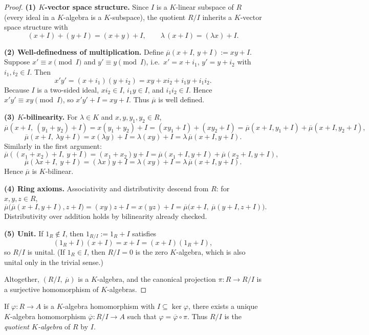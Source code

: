 \begin{proof}
\textbf{(1) $K$-vector space structure.}
Since $I$ is a $K$-linear subspace of $R$ (every ideal in a $K$-algebra is a $K$-subspace),
the quotient $R/I$ inherits a $K$-vector space structure with
\[
(x+I)+(y+I)=(x+y)+I,\qquad
\lambda\,(x+I)=(\lambda x)+I.
\]

\smallskip
\textbf{(2) Well-definedness of multiplication.}
Define $\overline{\mu}(x+I,\,y+I):=xy+I$.
Suppose $x'\equiv x\pmod I$ and $y'\equiv y\pmod I$, i.e.\ $x'=x+i_1$, $y'=y+i_2$ with $i_1,i_2\in I$.
Then
\[
x'y'=(x+i_1)(y+i_2)=xy + x i_2 + i_1 y + i_1 i_2.
\]
Because $I$ is a two-sided ideal, $x i_2\in I$, $i_1 y\in I$, and $i_1 i_2\in I$.
Hence $x'y'\equiv xy\pmod I$, so $x'y'+I=xy+I$.
Thus $\overline{\mu}$ is well defined.

\smallskip
\textbf{(3) $K$-bilinearity.}
For $\lambda\in K$ and $x,y,y_1,y_2\in R$,
\[
\overline{\mu}(x+I,\ (y_1+y_2)+I)
= x(y_1+y_2)+I
= (xy_1+I)+(xy_2+I)
= \overline{\mu}(x+I,y_1+I)+\overline{\mu}(x+I,y_2+I),
\]
\[
\overline{\mu}(x+I,\ \lambda y+I)
= x(\lambda y)+I
= \lambda(xy)+I
= \lambda\,\overline{\mu}(x+I,y+I).
\]
Similarly in the first argument:
\[
\overline{\mu}((x_1+x_2)+I,\ y+I)
= (x_1+x_2)y+I
= \overline{\mu}(x_1+I,y+I)+\overline{\mu}(x_2+I,y+I),
\]
\[
\overline{\mu}(\lambda x+I,\ y+I)
= (\lambda x)y+I
= \lambda(xy)+I
= \lambda\,\overline{\mu}(x+I,y+I).
\]
Hence $\overline{\mu}$ is $K$-bilinear.

\smallskip
\textbf{(4) Ring axioms.}
Associativity and distributivity descend from $R$:
for $x,y,z\in R$,
\[
\overline{\mu}\bigl(\overline{\mu}(x+I,y+I),z+I\bigr)
=(xy)z+I
= x(yz)+I
= \overline{\mu}\bigl(x+I,\ \overline{\mu}(y+I,z+I)\bigr).
\]
Distributivity over addition holds by bilinearity already checked.

\smallskip
\textbf{(5) Unit.}
If $1_R\notin I$, then $1_{R/I}:=1_R+I$ satisfies
\[
(1_R+I)(x+I)=x+I=(x+I)(1_R+I),
\]
so $R/I$ is unital. (If $1_R\in I$, then $R/I=0$ is the zero $K$-algebra, which is also unital only in the trivial sense.)

\smallskip
Altogether, $(R/I,\ \overline{\mu})$ is a $K$-algebra, and the canonical projection
$\pi:R\to R/I$ is a surjective homomorphism of $K$-algebras.
\end{proof}

\begin{remark}
If $\varphi:R\to A$ is a $K$-algebra homomorphism with $I\subseteq\ker\varphi$, there exists a unique $K$-algebra homomorphism
$\overline{\varphi}:R/I\to A$ such that $\varphi=\overline{\varphi}\circ\pi$.
Thus $R/I$ is the \emph{quotient $K$-algebra} of $R$ by $I$.
\end{remark}

